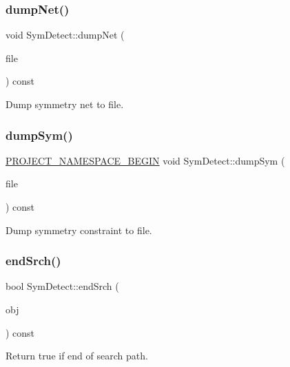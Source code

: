 \subsubsection{\texorpdfstring{dump\+Net()}{dumpNet()}}
{\footnotesize\ttfamily void Sym\+Detect\+::dump\+Net (\begin{DoxyParamCaption}\item[{const std\+::string}]{file }\end{DoxyParamCaption}) const}



Dump symmetry net to file. 

\mbox{\label{classSymDetect_a12ab74214af31ed8fc5608e958e74786}} 
\subsubsection{\texorpdfstring{dump\+Sym()}{dumpSym()}}
{\footnotesize\ttfamily \hyperlink{namespace_8h_ae48726a24dab2034454cf6d79e531eb8}{P\+R\+O\+J\+E\+C\+T\+\_\+\+N\+A\+M\+E\+S\+P\+A\+C\+E\+\_\+\+B\+E\+G\+IN} void Sym\+Detect\+::dump\+Sym (\begin{DoxyParamCaption}\item[{const std\+::string}]{file }\end{DoxyParamCaption}) const}



Dump symmetry constraint to file. 

\mbox{\label{classSymDetect_ac46824a93f71489b6c9f1aec961a0f8d}} 
\subsubsection{\texorpdfstring{end\+Srch()}{endSrch()}}
{\footnotesize\ttfamily bool Sym\+Detect\+::end\+Srch (\begin{DoxyParamCaption}\item[{\hyperlink{classMosPair}{Mos\+Pair} \&}]{obj }\end{DoxyParamCaption}) const\hspace{0.3cm}{\ttfamily [private]}}



Return true if end of search path. 

